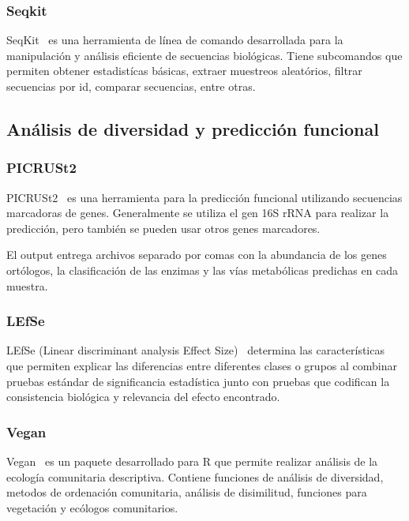 
\subsubsection{Seqkit}
SeqKit~\cite{shen2016seqkit} es una herramienta de línea de comando desarrollada para la manipulación y análisis eficiente de secuencias biológicas. 
Tiene subcomandos que permiten obtener estadistícas básicas, extraer muestreos aleatórios, filtrar secuencias por id, comparar secuencias, entre otras.

\subsection{Análisis de diversidad y predicción funcional}
\subsubsection{PICRUSt2}
PICRUSt2~\cite{douglas2020picrust2} es una herramienta para la predicción funcional utilizando secuencias marcadoras de genes.
Generalmente se utiliza el gen 16S rRNA para realizar la predicción, pero también se pueden usar otros genes marcadores.

El output entrega archivos separado por comas con la abundancia de los genes ortólogos, la clasificación de las enzimas y las vías metabólicas predichas en cada muestra.

\subsubsection{LEfSe}
LEfSe (Linear discriminant analysis Effect Size)~\cite{segata2011metagenomic}  determina las características que permiten explicar las diferencias entre diferentes clases o grupos al combinar pruebas estándar de significancia estadística junto con pruebas que codifican la consistencia biológica y relevancia del efecto encontrado. 
\subsubsection{Vegan}
Vegan~\cite{dixon2003vegan} es un paquete desarrollado para R que permite realizar análisis de la ecología comunitaria descriptiva. Contiene funciones de análisis de diversidad,  metodos de ordenación comunitaria, análisis de disimilitud, funciones para vegetación y ecólogos comunitarios.


